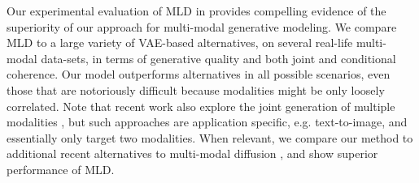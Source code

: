 Our experimental evaluation of \gls{MLD} in  provides compelling evidence of the superiority of our approach for multi-modal generative modeling. We compare \gls{MLD} to a large variety of \gls{VAE}-based alternatives, on several real-life multi-modal data-sets, in terms of generative quality and both joint and conditional coherence. Our model outperforms alternatives in all possible scenarios, even those that are notoriously difficult because modalities might be only loosely correlated. 
Note that recent work also explore the joint generation of multiple modalities \cite{Ruan2022, Hu2022}, but such approaches are application specific, e.g. text-to-image, and essentially only target two modalities. When relevant, we compare our method to additional recent alternatives to multi-modal diffusion \citep{bao2023transformer, wesego2023scorebased}, and show superior performance of \gls{MLD}.




